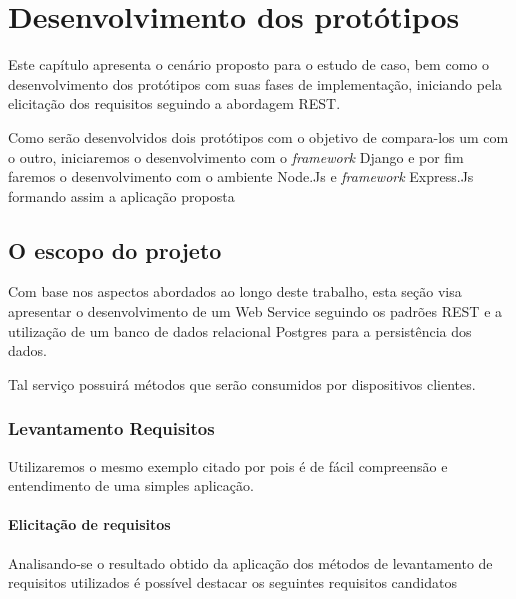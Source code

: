 
\chapter{Desenvolvimento dos protótipos}
\label{desenvolvimento-prototipos}

\vspace{-1.9cm}


  Este capítulo apresenta o cenário proposto para o estudo de caso, bem
  como o desenvolvimento dos protótipos com suas fases de implementação, iniciando
  pela elicitação dos requisitos seguindo a abordagem \ac{REST}.
  
  Como serão desenvolvidos dois protótipos com o objetivo de compara-los um com o outro,
  iniciaremos o desenvolvimento com o \textit{framework} Django e por fim faremos o desenvolvimento
  com o ambiente Node.Js e \textit{framework} Express.Js formando assim a aplicação proposta
  
\section{O escopo do projeto}
\label{escopo-projeto}

  Com base nos aspectos abordados ao longo deste trabalho, 
  esta seção visa apresentar o desenvolvimento de um Web Service seguindo os padrões \ac{REST} e a utilização 
  de um banco de dados relacional Postgres para a persistência dos dados.
  
  Tal serviço possuirá métodos que serão consumidos por dispositivos clientes.

\subsection{Levantamento Requisitos}
\label{levantamento-requisitos}

  Utilizaremos o mesmo exemplo citado por \cite{Pereira:2013} pois é de fácil compreensão
  e entendimento de uma simples aplicação.

\subsubsection{Elicitação de requisitos}

  Analisando-se o resultado obtido da aplicação dos métodos de levantamento
  de requisitos utilizados é possível destacar os seguintes requisitos candidatos

